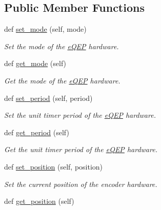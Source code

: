 \subsection*{Public Member Functions}
\begin{DoxyCompactItemize}
\item 
def \hyperlink{classeqep_1_1eQEP_ab214d60b7425c1d7803e3dff282b4255}{set\+\_\+mode} (self, mode)
\begin{DoxyCompactList}\small\item\em Set the mode of the \hyperlink{classeqep_1_1eQEP}{e\+Q\+EP} hardware. \end{DoxyCompactList}\item 
def \hyperlink{classeqep_1_1eQEP_a0b00fff3014216779db96333c76c41d9}{get\+\_\+mode} (self)\hypertarget{classeqep_1_1eQEP_a0b00fff3014216779db96333c76c41d9}{}\label{classeqep_1_1eQEP_a0b00fff3014216779db96333c76c41d9}

\begin{DoxyCompactList}\small\item\em Get the mode of the \hyperlink{classeqep_1_1eQEP}{e\+Q\+EP} hardware. \end{DoxyCompactList}\item 
def \hyperlink{classeqep_1_1eQEP_af025879aa5f70b38b8309de87c06df43}{set\+\_\+period} (self, period)
\begin{DoxyCompactList}\small\item\em Set the unit timer period of the \hyperlink{classeqep_1_1eQEP}{e\+Q\+EP} hardware. \end{DoxyCompactList}\item 
def \hyperlink{classeqep_1_1eQEP_a21826fd1f1b7524fe3883e25f619de1f}{get\+\_\+period} (self)\hypertarget{classeqep_1_1eQEP_a21826fd1f1b7524fe3883e25f619de1f}{}\label{classeqep_1_1eQEP_a21826fd1f1b7524fe3883e25f619de1f}

\begin{DoxyCompactList}\small\item\em Get the unit timer period of the \hyperlink{classeqep_1_1eQEP}{e\+Q\+EP} hardware. \end{DoxyCompactList}\item 
def \hyperlink{classeqep_1_1eQEP_a4cc40a4f3989be38ae46e427e09dfb04}{set\+\_\+position} (self, position)
\begin{DoxyCompactList}\small\item\em Set the current position of the encoder hardware. \end{DoxyCompactList}\item 
def \hyperlink{classeqep_1_1eQEP_aec4ddf0439a2df98e527b2963925d397}{get\+\_\+position} (self)\hypertarget{classeqep_1_1eQEP_aec4ddf0439a2df98e527b2963925d397}{}\label{classeqep_1_1eQEP_aec4ddf0439a2df98e527b2963925d397}


\end{DoxyCompactItemize}
